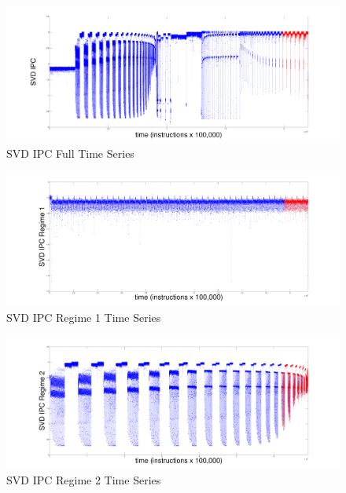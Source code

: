 \documentclass{article}
\begin{document}
\begin{figure}[htbp]
\begin{center}
\includegraphics[width=\textwidth]{figs/full}\caption{SVD IPC Full Time Series}
\label{default}
\end{center}
\end{figure}


\begin{figure}[htbp]
\begin{center}
\includegraphics[width=\textwidth]{figs/regime1}\caption{SVD IPC Regime 1 Time Series}
\label{default}
\end{center}
\end{figure}


\begin{figure}[htbp]
\begin{center}
\includegraphics[width=\textwidth]{figs/regime2}\caption{SVD IPC Regime 2 Time Series}
\label{default}
\end{center}
\end{figure}
\end{document}
